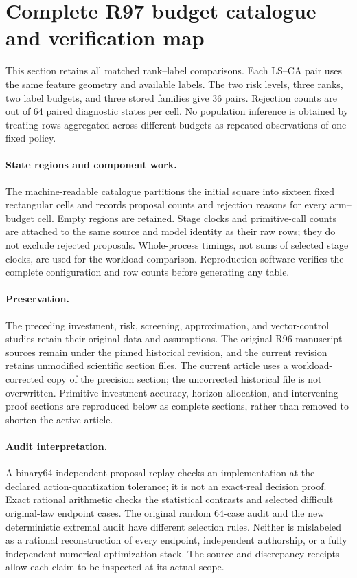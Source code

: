 \section{Complete R97 budget catalogue and verification map}\label{sec:evidence97}
This section retains all matched rank--label comparisons. Each LS--CA pair uses the same feature geometry and available labels. The two risk levels, three ranks, two label budgets, and three stored families give 36 pairs. Rejection counts are out of 64 paired diagnostic states per cell. No population inference is obtained by treating rows aggregated across different budgets as repeated observations of one fixed policy.


\paragraph{State regions and component work.}
The machine-readable catalogue partitions the initial square into sixteen fixed rectangular cells and records proposal counts and rejection reasons for every arm--budget cell. Empty regions are retained. Stage clocks and primitive-call counts are attached to the same source and model identity as their raw rows; they do not exclude rejected proposals. Whole-process timings, not sums of selected stage clocks, are used for the workload comparison. Reproduction software verifies the complete configuration and row counts before generating any table.

\paragraph{Preservation.}
The preceding investment, risk, screening, approximation, and vector-control studies retain their original data and assumptions. The original R96 manuscript sources remain under the pinned historical revision, and the current revision retains unmodified scientific section files. The current article uses a workload-corrected copy of the precision section; the uncorrected historical file is not overwritten. Primitive investment accuracy, horizon allocation, and intervening proof sections are reproduced below as complete sections, rather than removed to shorten the active article.

\paragraph{Audit interpretation.}
A binary64 independent proposal replay checks an implementation at the declared action-quantization tolerance; it is not an exact-real decision proof. Exact rational arithmetic checks the statistical contrasts and selected difficult original-law endpoint cases. The original random 64-case audit and the new deterministic extremal audit have different selection rules. Neither is mislabeled as a rational reconstruction of every endpoint, independent authorship, or a fully independent numerical-optimization stack. The source and discrepancy receipts allow each claim to be inspected at its actual scope.
